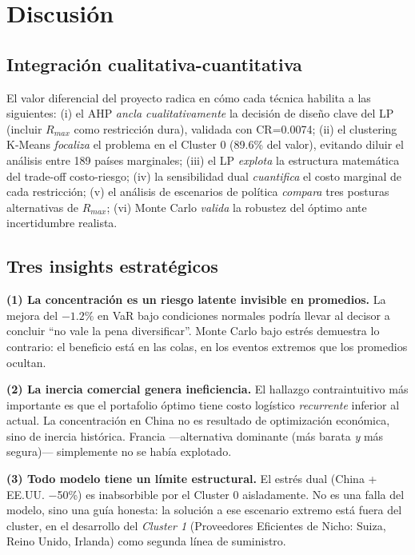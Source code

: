 \documentclass[11pt,a4paper]{article}
\begin{document}
\section{Discusión}

\subsection{Integración cualitativa-cuantitativa}

El valor diferencial del proyecto radica en cómo cada técnica habilita a las siguientes: (i) el AHP \emph{ancla cualitativamente} la decisión de diseño clave del LP (incluir $R_{max}$ como restricción dura), validada con CR=0.0074; (ii) el clustering K-Means \emph{focaliza} el problema en el Cluster 0 (89.6\% del valor), evitando diluir el análisis entre 189 países marginales; (iii) el LP \emph{explota} la estructura matemática del trade-off costo-riesgo; (iv) la sensibilidad dual \emph{cuantifica} el costo marginal de cada restricción; (v) el análisis de escenarios de política \emph{compara} tres posturas alternativas de $R_{max}$; (vi) Monte Carlo \emph{valida} la robustez del óptimo ante incertidumbre realista.

\subsection{Tres insights estratégicos}

\textbf{(1) La concentración es un riesgo latente invisible en promedios.} La mejora del $-1.2\%$ en VaR bajo condiciones normales podría llevar al decisor a concluir ``no vale la pena diversificar''. Monte Carlo bajo estrés demuestra lo contrario: el beneficio está en las colas, en los eventos extremos que los promedios ocultan.

\textbf{(2) La inercia comercial genera ineficiencia.} El hallazgo contraintuitivo más importante es que el portafolio óptimo tiene costo logístico \emph{recurrente} inferior al actual. La concentración en China no es resultado de optimización económica, sino de inercia histórica. Francia ---alternativa dominante (más barata \emph{y} más segura)--- simplemente no se había explotado.

\textbf{(3) Todo modelo tiene un límite estructural.} El estrés dual (China + EE.UU. $-$50\%) es inabsorbible por el Cluster 0 aisladamente. No es una falla del modelo, sino una guía honesta: la solución a ese escenario extremo está fuera del cluster, en el desarrollo del \emph{Cluster 1} (Proveedores Eficientes de Nicho: Suiza, Reino Unido, Irlanda) como segunda línea de suministro.
\end{document}
